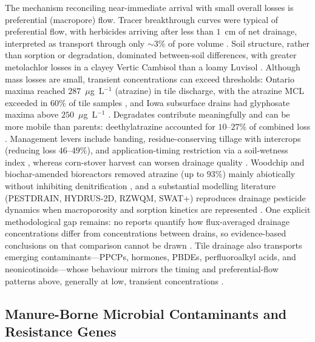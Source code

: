 \documentclass[11pt]{article}
\begin{document}
The mechanism reconciling near-immediate arrival with small overall losses is
preferential (macropore) flow. Tracer breakthrough curves were typical of
preferential flow, with herbicides arriving after less than $1$~cm of net
drainage, interpreted as transport through only $\sim3\%$ of pore volume
\parencite{Fortin2002,Dousset2004}. Soil structure, rather than sorption or
degradation, dominated between-soil differences, with greater metolachlor
losses in a clayey Vertic Cambisol than a loamy Luvisol
\parencite{Novak2001,Novak2003}. Although mass losses are small, transient
concentrations can exceed thresholds: Ontario maxima reached
$287$~$\mu$g~L$^{-1}$ (atrazine) in tile discharge, with the atrazine MCL
exceeded in $60\%$ of tile samples \parencite{GAYNOR1995}, and Iowa subsurface
drains had glyphosate maxima above $250$~$\mu$g~L$^{-1}$ \parencite{Coupe2012}.
Degradates contribute meaningfully and can be more mobile than parents:
deethylatrazine accounted for $10$--$27\%$ of combined loss
\parencite{GAYNOR1995,MUIR1978,JAYACHANDRAN1994}. Management levers include
banding, residue-conserving tillage with intercrops (reducing loss
$46$--$49\%$), and application-timing restriction via a soil-wetness index
\parencite{Gaynor2001,Julien2023,Moorman1999}, whereas corn-stover harvest can
worsen drainage quality \parencite{Shipitalo2016}. Woodchip and
biochar-amended bioreactors removed atrazine (up to $93\%$) mainly abiotically
without inhibiting denitrification \parencite{Hassanpour2019,Ilhan2011}, and a
substantial modelling literature (PESTDRAIN, HYDRUS-2D, RZWQM, SWAT+)
reproduces drainage pesticide dynamics when macroporosity and sorption
kinetics are represented
\parencite{Branger2009,Boivin2006,Shipitalo2016,Wendell2024,Novak2003}. One
explicit methodological gap remains: no reports quantify how flux-averaged
drainage concentrations differ from concentrations between drains, so
evidence-based conclusions on that comparison cannot be drawn
\parencite{Jacobsen2007}. Tile drainage also transports emerging
contaminants---PPCPs, hormones, PBDEs, perfluoroalkyl acids, and
neonicotinoids---whose behaviour mirrors the timing and preferential-flow
patterns above, generally at low, transient concentrations
\parencite{Gottschall2012,Gottschall2013,Gottschall2017,Ghirardini2019,Schaafsma2019}.

\subsection{Manure-Borne Microbial Contaminants and Resistance Genes}
\end{document}
